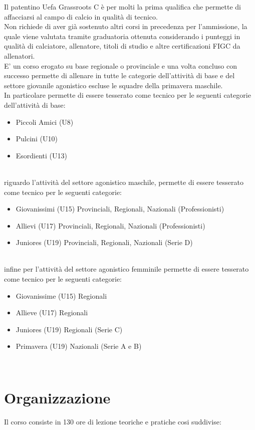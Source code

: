 \documentclass[../uefaC.tex]{subfiles}
\begin{document}
Il patentino Uefa Grassroots C è per molti la prima qualifica che permette di affacciarsi al campo di calcio in qualità di tecnico. \hfill \\
Non richiede di aver già sostenuto altri corsi in precedenza per l'ammissione, la quale viene valutata tramite graduatoria ottenuta considerando i punteggi in qualità di calciatore, allenatore, titoli di studio e altre certificazioni FIGC da allenatori.
\hfill \\
E' un corso erogato su base regionale o provinciale e una volta concluso con successo permette di allenare in tutte le categorie dell'attività di base e del settore giovanile agonistico escluse le squadre della primavera maschile.
\hfill \\
In particolare permette di essere tesserato come tecnico per le seguenti categorie dell'attività di base:
\begin{itemize}
    \item Piccoli Amici (U8)
    \item Pulcini (U10)
    \item Esordienti (U13)
\end{itemize}
\hfill \\
riguardo l'attività del settore agonistico maschile, permette di essere tesserato come tecnico per le seguenti categorie:
\begin{itemize}
\item Giovanissimi (U15) Provinciali, Regionali, Nazionali (Professionisti)
\item Allievi (U17) Provinciali, Regionali, Nazionali (Professionisti)
\item Juniores (U19) Provinciali, Regionali, Nazionali (Serie D)
\end{itemize}
\hfill \\
infine per l'attività del settore agonistico femminile permette di essere tesserato come tecnico per le seguenti categorie:
\begin{itemize}
    \item Giovanissime (U15) Regionali
    \item Allieve (U17) Regionali
    \item Juniores (U19) Regionali (Serie C)
    \item Primavera (U19) Nazionali (Serie A e B)
\end{itemize}
\hfill \\

\section{Organizzazione}
Il corso consiste in 130 ore di lezione teoriche e pratiche cosi suddivise: \hfill \\
\end{document}
